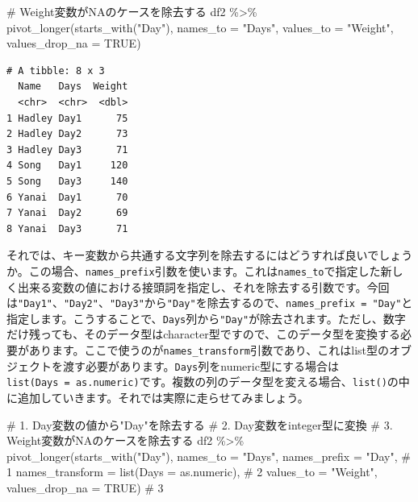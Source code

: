 \documentclass[
  a4paper,
  pandoc,
  ja=standard,
  jafont=haranoaji]{bxjsbook}
\newenvironment{Shaded}{\begin{snugshade}}{\end{snugshade}}
\newcommand{\AttributeTok}[1]{\textcolor[rgb]{0.00,0.48,0.65}{#1}}
\newcommand{\CommentTok}[1]{\textcolor[rgb]{0.37,0.37,0.37}{#1}}
\newcommand{\ConstantTok}[1]{\textcolor[rgb]{0.56,0.35,0.01}{#1}}
\newcommand{\FunctionTok}[1]{\textcolor[rgb]{0.28,0.35,0.67}{#1}}
\newcommand{\NormalTok}[1]{\textcolor[rgb]{0.00,0.48,0.65}{#1}}
\newcommand{\SpecialCharTok}[1]{\textcolor[rgb]{0.37,0.37,0.37}{#1}}
\newcommand{\StringTok}[1]{\textcolor[rgb]{0.13,0.47,0.30}{#1}}
\begin{document}
\begin{Shaded}
\begin{Highlighting}[numbers=left,,]
\CommentTok{\# Weight変数がNAのケースを除去する}
\NormalTok{df2 }\SpecialCharTok{\%\textgreater{}\%}
  \FunctionTok{pivot\_longer}\NormalTok{(}\FunctionTok{starts\_with}\NormalTok{(}\StringTok{"Day"}\NormalTok{),}
               \AttributeTok{names\_to       =} \StringTok{"Days"}\NormalTok{,}
               \AttributeTok{values\_to      =} \StringTok{"Weight"}\NormalTok{,}
               \AttributeTok{values\_drop\_na =} \ConstantTok{TRUE}\NormalTok{)}
\end{Highlighting}
\end{Shaded}

\begin{verbatim}
# A tibble: 8 x 3
  Name   Days  Weight
  <chr>  <chr>  <dbl>
1 Hadley Day1      75
2 Hadley Day2      73
3 Hadley Day3      71
4 Song   Day1     120
5 Song   Day3     140
6 Yanai  Day1      70
7 Yanai  Day2      69
8 Yanai  Day3      71
\end{verbatim}

それでは、キー変数から共通する文字列を除去するにはどうすれば良いでしょうか。この場合、\texttt{names\_prefix}引数を使います。これは\texttt{names\_to}で指定した新しく出来る変数の値における接頭詞を指定し、それを除去する引数です。今回は\texttt{"Day1"}、\texttt{"Day2"}、\texttt{"Day3"}から\texttt{"Day"}を除去するので、\texttt{names\_prefix\ =\ "Day"}と指定します。こうすることで、\texttt{Days}列から\texttt{"Day"}が除去されます。ただし、数字だけ残っても、そのデータ型はcharacter型ですので、このデータ型を変換する必要があります。ここで使うのが\texttt{names\_transform}引数であり、これはlist型のオブジェクトを渡す必要があります。\texttt{Days}列をnumeric型にする場合は\texttt{list(Days\ =\ as.numeric)}です。複数の列のデータ型を変える場合、\texttt{list()}の中に追加していきます。それでは実際に走らせてみましょう。

\begin{Shaded}
\begin{Highlighting}[numbers=left,,]
\CommentTok{\# 1. Day変数の値から"Day"を除去する}
\CommentTok{\# 2. Day変数をinteger型に変換}
\CommentTok{\# 3. Weight変数がNAのケースを除去する}
\NormalTok{df2 }\SpecialCharTok{\%\textgreater{}\%}
  \FunctionTok{pivot\_longer}\NormalTok{(}\FunctionTok{starts\_with}\NormalTok{(}\StringTok{"Day"}\NormalTok{),}
               \AttributeTok{names\_to        =} \StringTok{"Days"}\NormalTok{,}
               \AttributeTok{names\_prefix    =} \StringTok{"Day"}\NormalTok{,                   }\CommentTok{\# 1}
               \AttributeTok{names\_transform =} \FunctionTok{list}\NormalTok{(}\AttributeTok{Days =}\NormalTok{ as.numeric), }\CommentTok{\# 2}
               \AttributeTok{values\_to       =} \StringTok{"Weight"}\NormalTok{,}
               \AttributeTok{values\_drop\_na  =} \ConstantTok{TRUE}\NormalTok{)                    }\CommentTok{\# 3}
\end{Highlighting}
\end{Shaded}
\end{document}
